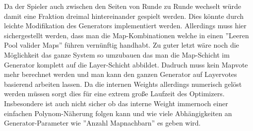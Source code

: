         Da der Spieler auch zwischen den Seiten von Runde zu Runde wechselt würde damit eine Fraktion dreimal hintereinander gespielt werden.
        Dies könnte durch leichte Modifikation des Generators implementiert werden. 
        Allerdings muss hier sichergestellt werden, dass man die Map-Kombinationen welche in einen ''Leeren Pool valider Maps'' führen vernünftig handhabt.
        Zu guter letzt wäre noch die Möglichkeit das ganze System so umzubauen das man die Map-Schicht im Generator komplett auf die Layer-Schicht abbildet.
        Dadruch muss kein Mapvote mehr berechnet werden und man kann den ganzen Generator auf Layervotes basierend arbeiten lassen.
        Da die internen Weights allerdings numerisch gelöst werden müssen sorgt dies für eine extrem große Laufzeit des Optimizers.
        Insbesondere ist auch nicht sicher ob das interne Weight immernoch einer einfachen Polynom-Näherung folgen kann und wie viele Abhängigkeiten an Generator-Parameter wie ''Anzahl Mapnachbarn'' es geben wird. 